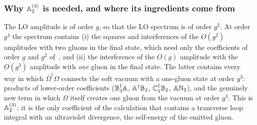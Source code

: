 \subsubsection*{Why \texorpdfstring{$\mathbb{A}^{(3)}_2$}{A2(3)} is needed, and where its ingredients come from}\label{sec:whyA3}

The LO amplitude is of order $g$, so that the LO spectrum is of order $g^2$. At order $g^4$ the spectrum contains (i) the squares and interferences of the $O(g^2)$ amplitudes with two gluons in the final state, which need only the coefficients of order $g$ and $g^2$ of~\cite{Radhakrishnan:2026soft}, and (ii) the interference of the $O(g)$ amplitude with the $O(g^3)$ amplitude with \emph{one} gluon in the final state. The latter contains every way in which $\bar\Omega^\dagger\Omega$ connects the soft vacuum with a one-gluon state at order $g^3$: products of lower-order coefficients ($\mathbb{B}_3^\dagger\mathbb{A}$, $\mathbb{A}^\dagger\mathbb{B}_2$, $\mathbb{C}_1^\dagger\mathbb{B}_2$, $\mathbb{A}\mathbb{N}_2$), and the genuinely new term in which $\Omega$ itself creates one gluon from the vacuum at order $g^3$. This is $\mathbb{A}^{(3)}_2$; it is the only coefficient of the calculation that contains a transverse loop integral with an ultraviolet divergence, the self-energy of the emitted gluon.

